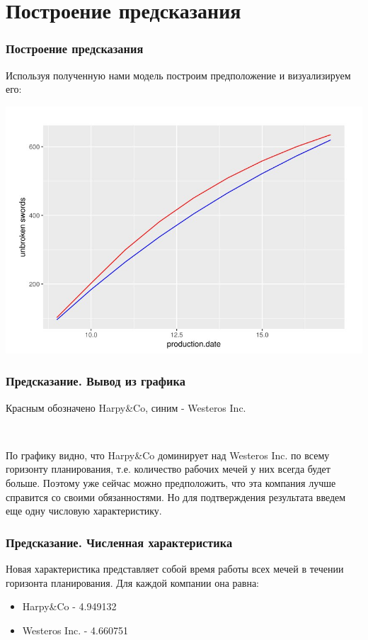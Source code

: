 \documentclass{beamer}
\begin{document}
\section{Построение предсказания}

\begin{frame}
    \frametitle{Построение предсказания}
    Используя полученную нами модель построим предположение и визуализируем его:
    
    \includegraphics[scale = 0.4]{swords.png}
    
\end{frame}

\begin{frame}
    \frametitle{Предсказание. Вывод из графика}
    
    Красным обозначено Harpy\&Co, синим - Westeros Inc. 
    
    \
    
    По графику видно, что Harpy\&Co доминирует над Westeros Inc. по всему горизонту планирования, т.е. количество рабочих мечей у них всегда будет больше. Поэтому уже сейчас можно предположить, что эта компания лучше справится со своими обязанностями. Но для подтверждения результата введем еще одну числовую характеристику.
\end{frame}

\begin{frame}
    \frametitle{Предсказание. Численная характеристика}
    
    Новая характеристика представляет собой время работы всех мечей в течении горизонта планирования. Для каждой компании она равна:
    
    \begin{itemize}
        \item Harpy\&Co - 4.949132
        \item Westeros Inc. - 4.660751
    \end{itemize}
\end{frame}
\end{document}
